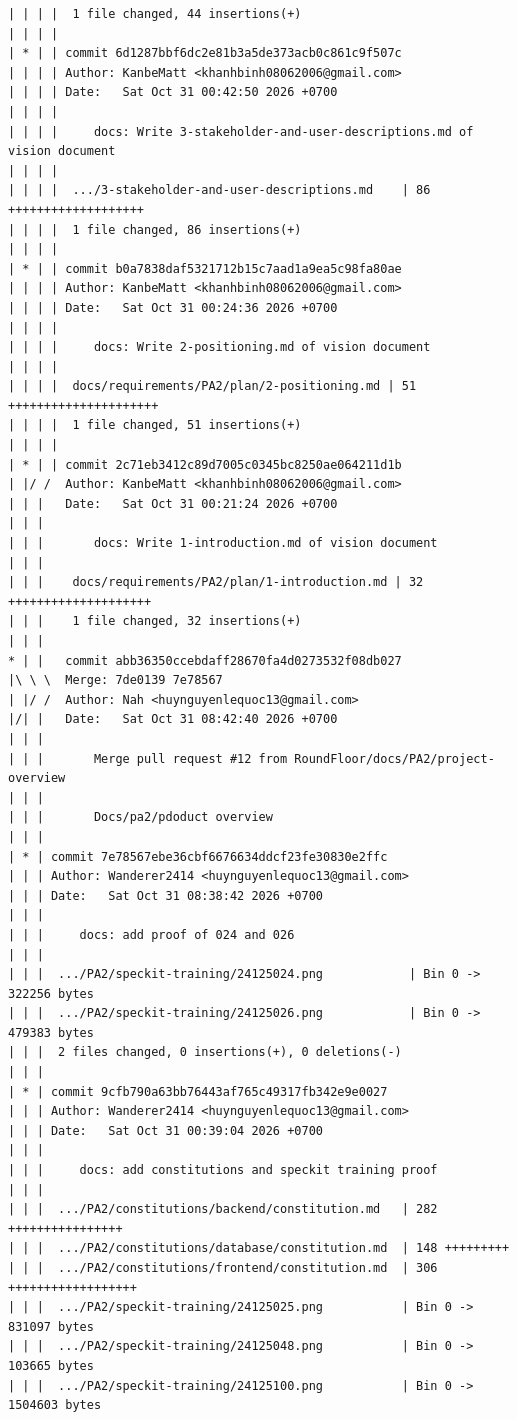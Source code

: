 \documentclass[12pt]{article}
\begin{document}
\begin{lstlisting}[numbers=none,breaklines=true]
| | | |  1 file changed, 44 insertions(+)
| | | |
| * | | commit 6d1287bbf6dc2e81b3a5de373acb0c861c9f507c
| | | | Author: KanbeMatt <khanhbinh08062006@gmail.com>
| | | | Date:   Sat Oct 31 00:42:50 2026 +0700
| | | |
| | | |     docs: Write 3-stakeholder-and-user-descriptions.md of vision document
| | | |
| | | |  .../3-stakeholder-and-user-descriptions.md    | 86 +++++++++++++++++++
| | | |  1 file changed, 86 insertions(+)
| | | |
| * | | commit b0a7838daf5321712b15c7aad1a9ea5c98fa80ae
| | | | Author: KanbeMatt <khanhbinh08062006@gmail.com>
| | | | Date:   Sat Oct 31 00:24:36 2026 +0700
| | | |
| | | |     docs: Write 2-positioning.md of vision document
| | | |
| | | |  docs/requirements/PA2/plan/2-positioning.md | 51 +++++++++++++++++++++
| | | |  1 file changed, 51 insertions(+)
| | | |
| * | | commit 2c71eb3412c89d7005c0345bc8250ae064211d1b
| |/ /  Author: KanbeMatt <khanhbinh08062006@gmail.com>
| | |   Date:   Sat Oct 31 00:21:24 2026 +0700
| | |
| | |       docs: Write 1-introduction.md of vision document
| | |
| | |    docs/requirements/PA2/plan/1-introduction.md | 32 ++++++++++++++++++++
| | |    1 file changed, 32 insertions(+)
| | |
* | |   commit abb36350ccebdaff28670fa4d0273532f08db027
|\ \ \  Merge: 7de0139 7e78567
| |/ /  Author: Nah <huynguyenlequoc13@gmail.com>
|/| |   Date:   Sat Oct 31 08:42:40 2026 +0700
| | |
| | |       Merge pull request #12 from RoundFloor/docs/PA2/project-overview
| | |
| | |       Docs/pa2/pdoduct overview
| | |
| * | commit 7e78567ebe36cbf6676634ddcf23fe30830e2ffc
| | | Author: Wanderer2414 <huynguyenlequoc13@gmail.com>
| | | Date:   Sat Oct 31 08:38:42 2026 +0700
| | |
| | |     docs: add proof of 024 and 026
| | |
| | |  .../PA2/speckit-training/24125024.png            | Bin 0 -> 322256 bytes
| | |  .../PA2/speckit-training/24125026.png            | Bin 0 -> 479383 bytes
| | |  2 files changed, 0 insertions(+), 0 deletions(-)
| | |
| * | commit 9cfb790a63bb76443af765c49317fb342e9e0027
| | | Author: Wanderer2414 <huynguyenlequoc13@gmail.com>
| | | Date:   Sat Oct 31 00:39:04 2026 +0700
| | |
| | |     docs: add constitutions and speckit training proof
| | |
| | |  .../PA2/constitutions/backend/constitution.md   | 282 ++++++++++++++++
| | |  .../PA2/constitutions/database/constitution.md  | 148 +++++++++
| | |  .../PA2/constitutions/frontend/constitution.md  | 306 ++++++++++++++++++
| | |  .../PA2/speckit-training/24125025.png           | Bin 0 -> 831097 bytes
| | |  .../PA2/speckit-training/24125048.png           | Bin 0 -> 103665 bytes
| | |  .../PA2/speckit-training/24125100.png           | Bin 0 -> 1504603 bytes

\end{lstlisting}
\end{document}
